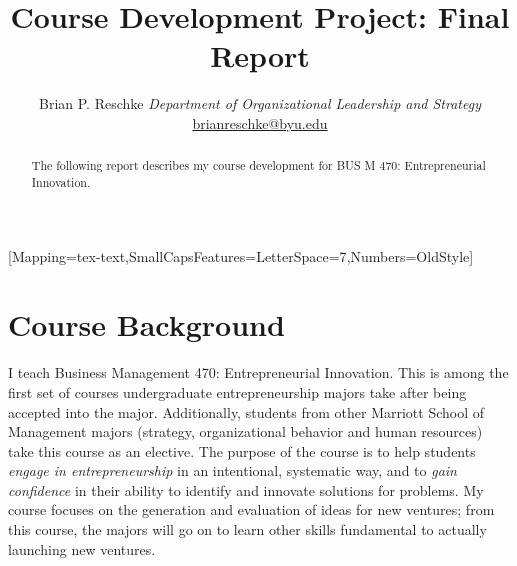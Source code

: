 \documentclass[11pt,article,oneside]{memoir}
\author{\Large Brian P. Reschke\vspace{0.05in} \newline\normalsize\emph{Department of Organizational Leadership and Strategy} \newline\footnotesize \protect\url{brianreschke@byu.edu}\vspace*{0.2in}\newline }
\date{}
\def\mytitle{\LARGE Course Development Project: Final Report}
\begin{document}


\setmainfont{Minion Pro}[Mapping=tex-text,SmallCapsFeatures={LetterSpace=7},Numbers=OldStyle]
\setsansfont[Mapping=tex-text]{Minion Pro}
\setmonofont[Mapping=tex-text,Scale=0.9]{Inconsolata}
\pagestyle{kjh}
\setcounter{secnumdepth}{-1}


\title{\mytitle}
\maketitle



\begin{abstract}

\noindent The following report describes my course development for BUS M 470:
Entrepreneurial Innovation.

\end{abstract}


\section{Course Background}\label{course-background}

I teach Business Management 470: Entrepreneurial Innovation. This is
among the first set of courses undergraduate entrepreneurship majors
take after being accepted into the major. Additionally, students from
other Marriott School of Management majors (strategy, organizational
behavior and human resources) take this course as an elective. The
purpose of the course is to help students \emph{engage in
entrepreneurship} in an intentional, systematic way, and to \emph{gain
confidence} in their ability to identify and innovate solutions for
problems. My course focuses on the generation and evaluation of ideas
for new ventures; from this course, the majors will go on to learn other
skills fundamental to actually launching new ventures.
\end{document}
